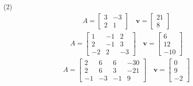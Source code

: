 \begin{tasks}[resume, style=enumerate](2)
\task
\begin{align*}A = \left[\begin{matrix}3 & -3\\2 & 1\end{matrix}\right] \quad \mathbf v = \left[\begin{matrix}21\\8\end{matrix}\right]\end{align*}
\task
  \begin{align*}
    A = \begin{bmatrix}
      1 & -1 & 2 \\
      2 & -1 & 3 \\
      -2 & 2 & -3
    \end{bmatrix} \quad \mathbf v =
    \begin{bmatrix}
      6 \\
      12 \\
      -10
    \end{bmatrix}
  \end{align*}
\task
\begin{align*}A = \left[\begin{matrix}2 & 6 & 6 & -30\\2 & 6 & 3 & -21\\-1 & -3 & -1 & 9\end{matrix}\right] \quad \mathbf v = \left[\begin{matrix}0\\9\\-2\end{matrix}\right]\end{align*}
\end{tasks}


